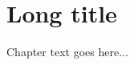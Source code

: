 \documentclass[../main.tex]{subfiles}
\begin{document}
\chapter[Short title]{Long title}
\label{cha:label1}

Chapter text goes here...

\biblio
\end{document}
